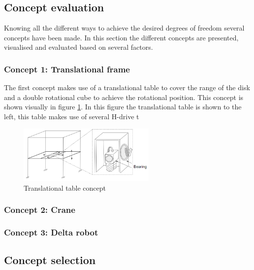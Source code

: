 \subsection{Concept evaluation}
Knowing all the different ways to achieve the desired degrees of freedom several concepts have been made. In this section the different concepts are presented, visualised and evaluated based on several factors.
\subsubsection{Concept 1: Translational frame}
The first concept makes use of a translational table to cover the range of the disk and a double rotational cube to achieve the rotational position. This concept is shown visually in figure \ref{fig:convential_concept_1}. In this figure the translational table is shown to the left, this table makes use of several H-drive t


\begin{figure}[!h]
    \centering
    \includegraphics[width=0.6\textwidth]{images/Conventional_concept_1.PNG}
    \caption{Translational table concept}
    \label{fig:convential_concept_1}
\end{figure}



\subsubsection{Concept 2: Crane}




\subsubsection{Concept 3: Delta robot}


\subsection{Concept selection}

